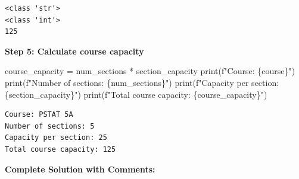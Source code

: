 \documentclass[
  11pt,
]{article}
\newenvironment{Shaded}{\begin{snugshade}}{\end{snugshade}}
\newcommand{\BuiltInTok}[1]{\textcolor[rgb]{0.00,0.23,0.31}{#1}}
\newcommand{\NormalTok}[1]{\textcolor[rgb]{0.00,0.23,0.31}{#1}}
\newcommand{\OperatorTok}[1]{\textcolor[rgb]{0.37,0.37,0.37}{#1}}
\newcommand{\SpecialCharTok}[1]{\textcolor[rgb]{0.37,0.37,0.37}{#1}}
\newcommand{\SpecialStringTok}[1]{\textcolor[rgb]{0.13,0.47,0.30}{#1}}
\begin{document}
\begin{verbatim}
<class 'str'>
<class 'int'>
125
\end{verbatim}

\textbf{Step 5: Calculate course capacity}

\begin{Shaded}
\begin{Highlighting}[]
\NormalTok{course\_capacity }\OperatorTok{=}\NormalTok{ num\_sections }\OperatorTok{*}\NormalTok{ section\_capacity}
\BuiltInTok{print}\NormalTok{(}\SpecialStringTok{f"Course: }\SpecialCharTok{\{}\NormalTok{course}\SpecialCharTok{\}}\SpecialStringTok{"}\NormalTok{)}
\BuiltInTok{print}\NormalTok{(}\SpecialStringTok{f"Number of sections: }\SpecialCharTok{\{}\NormalTok{num\_sections}\SpecialCharTok{\}}\SpecialStringTok{"}\NormalTok{)}
\BuiltInTok{print}\NormalTok{(}\SpecialStringTok{f"Capacity per section: }\SpecialCharTok{\{}\NormalTok{section\_capacity}\SpecialCharTok{\}}\SpecialStringTok{"}\NormalTok{)}
\BuiltInTok{print}\NormalTok{(}\SpecialStringTok{f"Total course capacity: }\SpecialCharTok{\{}\NormalTok{course\_capacity}\SpecialCharTok{\}}\SpecialStringTok{"}\NormalTok{)}
\end{Highlighting}
\end{Shaded}

\begin{verbatim}
Course: PSTAT 5A
Number of sections: 5
Capacity per section: 25
Total course capacity: 125
\end{verbatim}

\textbf{Complete Solution with Comments:}
\end{document}
